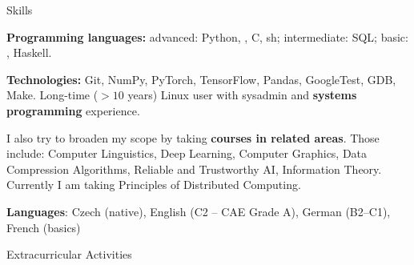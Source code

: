 %
%


\vfill\eject

\sekce Skills
 
{\bf Programming languages:} {\af advanced:} {\B Python}, {\B \Cpp}, {\B C}, {\B sh}; {\af intermediate:} {\B SQL}; {\af basic:} \Cis{}, Haskell.

\smallskip

{\bf Technologies:} {\af Git}, {\af NumPy}, {\af PyTorch}, {\af TensorFlow},
{\af Pandas}, {\af GoogleTest}, {\af GDB}, {\af Make}. Long-time ($> 10$ years) Linux user
with sysadmin and {\bf systems programming} experience.

\smallskip

I also try to broaden my scope by taking {\bf courses in related areas}. Those
include: Computer Linguistics, Deep Learning, Computer Graphics, Data
Compression Algorithms, Reliable and Trustworthy AI, Information Theory.
Currently I am taking Principles of Distributed Computing.

\smallskip

{\bf Languages}: Czech (native), English (C2 -- CAE Grade A), German (B2–C1), French (basics)


\iffalse
\sekce Teaching

\itemindent=.5\itemindent
\itemnarrow=0pt
\list{-}
	\: Programming II practicals for advanced students (\url{https://mj.ucw.cz/vyuka/1920/p2x/}{Spring~2020}, \url{https://mj.ucw.cz/vyuka/1819/p2x/}{Spring~2019}), co-taught with Martin Mareš
	\: Programming I practicals for advanced students (\url{https://mj.ucw.cz/vyuka/1920/p1x/}{Autumn~2019}), co-taught with Martin Mareš
\endlist

\fi

\sekce Extracurricular Activities



